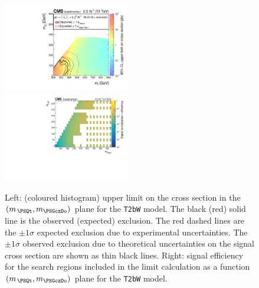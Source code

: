 \clearpage
\begin{figure}[t]
  \begin{center}
    \includegraphics[width=0.49\textwidth]{RA1T2bW-X05XSEC_aux} \, 
    \includegraphics[width=0.49\textwidth]{T2bW_X05_merging_4_cats_aux} \,     
  \end{center}
  \caption{Left: (coloured histogram) upper limit on the cross section in the $(m_{\,\PSQt}, m_{\PSGczDo})$ plane for the \texttt{T2bW} model. 
  The black (red) solid line is the observed (expected) exclusion. The red dashed lines are the $\pm1\sigma$ expected exclusion due to experimental uncertainties. 
  The $\pm1\sigma$ observed exclusion due to theoretical uncertainties on the signal cross section are shown as thin black lines. 
  Right: signal efficiency for the search regions included in the limit calculation as a function $(m_{\,\PSQt}, m_{\PSGczDo})$ plane for the \texttt{T2bW} model. 
  \label{fig:T2bW_X05_excl}}
\end{figure}

